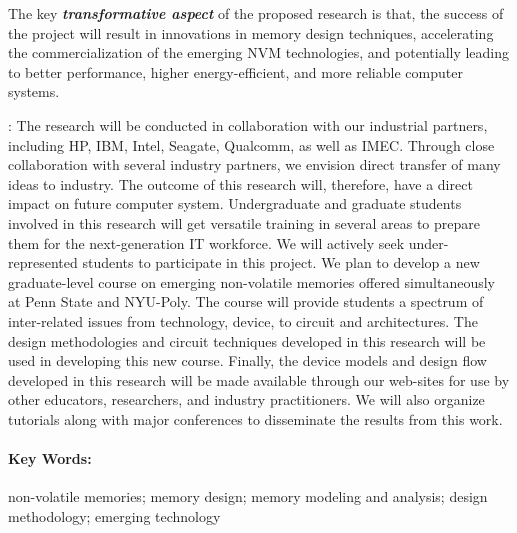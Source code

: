 \documentclass[11pt,letterpaper]{article}
\begin{document}
The key \textit{\textbf{transformative aspect}} of the proposed research is that, the success of the project will result in innovations in memory design techniques, accelerating the commercialization of the emerging NVM technologies, and potentially leading to better performance, higher energy-efficient, and more reliable computer systems.

{}: The research will be conducted in collaboration with our industrial partners, including HP, IBM, Intel, Seagate, Qualcomm, as well as IMEC. Through close collaboration with several industry partners, we envision direct transfer of many ideas to industry. The outcome of this research will, therefore, have a direct impact on future computer system. Undergraduate and graduate students involved in this research will get versatile training in several areas to prepare them for the next-generation IT workforce. We will actively seek under-represented students to participate in this project. We plan to develop a new graduate-level course on emerging non-volatile memories offered simultaneously at Penn State and NYU-Poly. The course will provide students a spectrum of inter-related issues from technology, device, to circuit and architectures. The design methodologies and circuit techniques developed in this research will be used in developing this new course. Finally, the device models and design flow developed in this research will be made available through our web-sites for use by other educators, researchers, and industry practitioners. We will also organize tutorials along with major conferences to disseminate the results from this work.

\paragraph{\textbf{Key Words:}} non-volatile memories; memory design; memory modeling and analysis; design methodology; emerging technology
\end{document}
